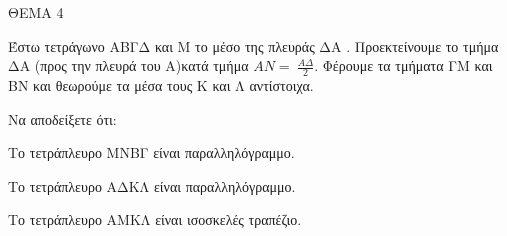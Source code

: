 
ΘΕΜΑ 4

Έστω τετράγωνο ΑΒΓΔ και Μ το μέσο της πλευράς ΔΑ . Προεκτείνουμε το τμήμα ΔΑ (προς την πλευρά του Α)κατά τμήμα $ΑΝ = \ \frac{Α\Delta}{2}$. Φέρουμε τα τμήματα ΓΜ και ΒΝ και θεωρούμε τα μέσα τους Κ και Λ αντίστοιχα.

Να αποδείξετε ότι:

\begin{alist}
\item Το τετράπλευρο ΜΝΒΓ είναι παραλληλόγραμμο. 

\item Το τετράπλευρο ΑΔΚΛ είναι παραλληλόγραμμο. 

\item Το τετράπλευρο ΑΜΚΛ είναι ισοσκελές τραπέζιο. 


\end{alist}
